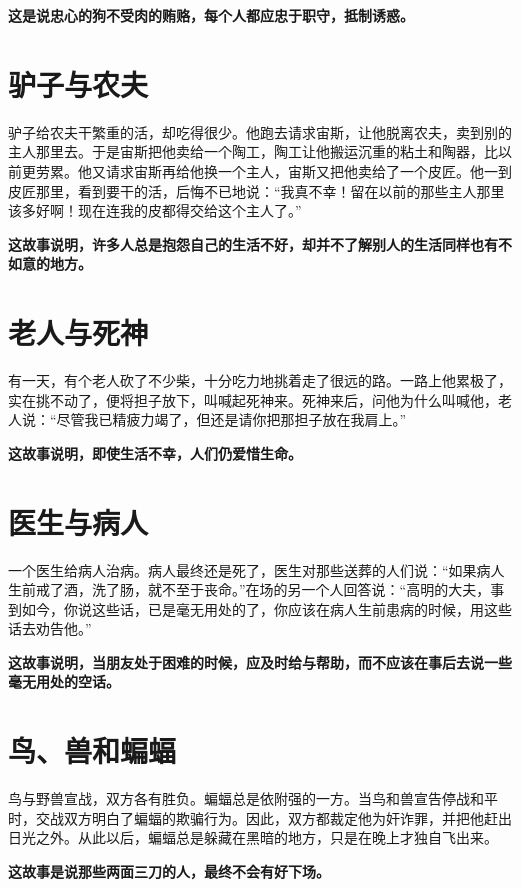 {\bfseries \color{red}这是说忠心的狗不受肉的贿赂，每个人都应忠于职守，抵制诱惑。}

\section{驴子与农夫}

驴子给农夫干繁重的活，却吃得很少。他跑去请求宙斯，让他脱离农夫，卖到别的主人那里去。于是宙斯把他卖给一个陶工，陶工让他搬运沉重的粘土和陶器，比以前更劳累。他又请求宙斯再给他换一个主人，宙斯又把他卖给了一个皮匠。他一到皮匠那里，看到要干的活，后悔不已地说：“我真不幸！留在以前的那些主人那里该多好啊！现在连我的皮都得交给这个主人了。”

{\bfseries \color{red}这故事说明，许多人总是抱怨自己的生活不好，却并不了解别人的生活同样也有不如意的地方。}

\section{老人与死神}

有一天，有个老人砍了不少柴，十分吃力地挑着走了很远的路。一路上他累极了，实在挑不动了，便将担子放下，叫喊起死神来。死神来后，问他为什么叫喊他，老人说：“尽管我已精疲力竭了，但还是请你把那担子放在我肩上。”

{\bfseries \color{red}这故事说明，即使生活不幸，人们仍爱惜生命。}

\section{医生与病人}

一个医生给病人治病。病人最终还是死了，医生对那些送葬的人们说：“如果病人生前戒了酒，洗了肠，就不至于丧命。”在场的另一个人回答说：“高明的大夫，事到如今，你说这些话，已是毫无用处的了，你应该在病人生前患病的时候，用这些话去劝告他。”

{\bfseries \color{red}这故事说明，当朋友处于困难的时候，应及时给与帮助，而不应该在事后去说一些毫无用处的空话。}

\section{鸟、兽和蝙蝠}

鸟与野兽宣战，双方各有胜负。蝙蝠总是依附强的一方。当鸟和兽宣告停战和平时，交战双方明白了蝙蝠的欺骗行为。因此，双方都裁定他为奸诈罪，并把他赶出日光之外。从此以后，蝙蝠总是躲藏在黑暗的地方，只是在晚上才独自飞出来。

{\bfseries \color{red}这故事是说那些两面三刀的人，最终不会有好下场。}

